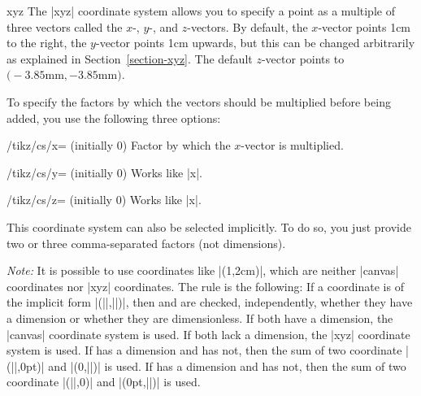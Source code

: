 \begin{coordinatesystem}{xyz}
    The |xyz| coordinate system allows you to specify a point as a multiple of
    three vectors called the $x$-, $y$-, and $z$-vectors. By default, the
    $x$-vector points 1cm to the right, the $y$-vector points 1cm upwards, but
    this can be changed arbitrarily as explained in Section~\ref{section-xyz}.
    The default $z$-vector points to
    $\bigl(-3.85\textrm{mm},-3.85\textrm{mm}\bigr)$.

    To specify the factors by which the vectors should be multiplied before
    being added, you use the following three options:
    \begin{key}{/tikz/cs/x= (initially 0)}
        Factor by which the $x$-vector is multiplied.
    \end{key}
    \begin{key}{/tikz/cs/y= (initially 0)}
        Works like |x|.
    \end{key}
    \begin{key}{/tikz/cs/z= (initially 0)}
        Works like |x|.
    \end{key}

\begin{codeexample}[]
\end{codeexample}

    This coordinate system can also be selected implicitly. To do so, you just
    provide two or three comma-separated factors (not dimensions).
\begin{codeexample}[]
\end{codeexample}
\end{coordinatesystem}

\emph{Note:} It is possible to use coordinates like |(1,2cm)|, which are
neither |canvas| coordinates nor |xyz| coordinates. The rule is the following:
If a coordinate is of the implicit form |(||,||)|, then
 and  are checked, independently, whether they have a dimension
or whether they are dimensionless. If both have a dimension, the |canvas|
coordinate system is used. If both lack a dimension, the |xyz| coordinate
system is used. If  has a dimension and  has not, then the sum
of two coordinate |(||,0pt)| and |(0,||)| is used. If 
has a dimension and  has not, then the sum of two coordinate
|(||,0)| and |(0pt,||)| is used.

